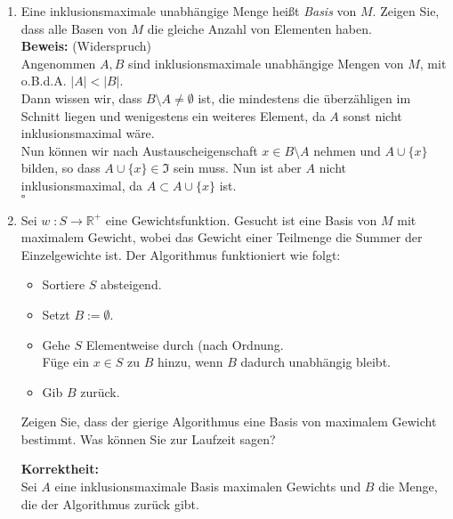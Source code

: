 \documentclass[11pt,a4paper,ngerman]{article}
\begin{document}
\begin{enumerate}[\bfseries (a)]

\item Eine inklusionsmaximale unabhängige Menge heißt \emph{Basis} von $M$. Zeigen Sie, dass alle Basen von $M$ die gleiche Anzahl von Elementen haben.\\

\textbf{Beweis:} (Widerspruch)\\
Angenommen $A,B$ sind inklusionsmaximale unabhängige Mengen von $M$, mit o.B.d.A. $|A| < |B|$.\\
Dann wissen wir, dass $B \setminus A \not= \emptyset$ ist, die mindestens die überzähligen im Schnitt liegen und wenigestens ein weiteres Element, da $A$ sonst nicht inklusionsmaximal wäre.\\

Nun können wir nach Austauscheigenschaft $x \in B \setminus A$ nehmen und $A \cup \{x \}$ bilden, so dass $A \cup \{ x \} \in \mathfrak{I}$ sein muss. Nun ist aber $A$ nicht inklusionsmaximal, da $A \subset A \cup \{x \}$ ist.\\
\mbox{} \hfill $\square$

\item Sei $w \; : S \longrightarrow \mathbb{R}^+$ eine Gewichtsfunktion. Gesucht ist eine Basis von $M$ mit maximalem Gewicht, wobei das Gewicht einer Teilmenge die Summer der Einzelgewichte ist. Der Algorithmus funktioniert wie folgt:\\

\begin{itemize}

\item Sortiere $S$ absteigend.

\item Setzt $B := \emptyset$.

\item Gehe $S$ Elementweise durch (nach Ordnung.\\
Füge ein $x \in S$ zu $B$ hinzu, wenn $B$ dadurch unabhängig bleibt.

\item Gib $B$ zurück.

\end{itemize}

Zeigen Sie, dass der gierige Algorithmus eine Basis von maximalem Gewicht bestimmt. Was können Sie zur Laufzeit sagen?

\textbf{Korrektheit:}\\

Sei $A$ eine inklusionsmaximale Basis maximalen Gewichts und $B$ die Menge, die der Algorithmus zurück gibt.\\


\end{enumerate}
\end{document}
